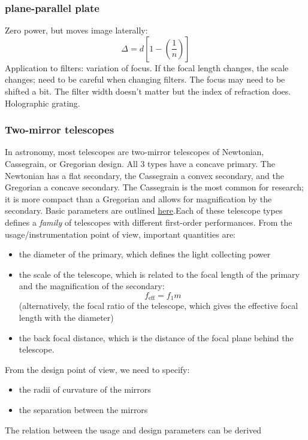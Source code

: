 \documentclass[12pt]{article}
\newcommand{\mynotes}[1]{\textcolor{myBlue}{#1}}
\begin{document}
\subsubsection{plane-parallel plate}
Zero power, but moves image laterally:
\[
    \Delta = d \left[ 1 - \left( \frac{1}{n} \right) \right]
    \]
Application to filters: variation of focus.
\mynotes{If the focal length
changes, the scale changes; need to be careful when changing filters.
The focus may need to be shifted a bit. The filter width doesn't matter
but the index of refraction does. Holographic grating.}

\subsubsection{Two-mirror telescopes}
In astronomy, most telescopes are two-mirror telescopes of Newtonian,
Cassegrain, or Gregorian design. All 3 types have a concave primary. The
Newtonian has a flat secondary, the Cassegrain a convex secondary, and the
Gregorian a concave secondary. The Cassegrain is the most common for research;
it is more compact than a Gregorian and allows for magnification by the
secondary. Basic parameters are outlined \href{http://astronomy.nmsu.edu/holtz/a535/html/diagrams/a535/cassegra.htm}
{here}.Each of these telescope types defines a \textit{family} of telescopes
with different first-order performances. From the usage/instrumentation point
of view, important quantities are:
\begin{itemize}
    \item the diameter of the primary, which defines the light
        collecting power
    \item the scale of the telescope, which is related to the focal
        length of the primary and the magnification of the secondary:
        \[
            f_{\textrm{eff}} = f_{1}m
            \]
        (alternatively, the focal ratio of the telescope, which gives
        the effective focal length with the diameter)
    \item the back focal distance, which is the distance of the focal
        plane behind the telescope.
\end{itemize}
From the design point of view, we need to specify:
\begin{itemize}
    \item the radii of curvature of the mirrors
    \item the separation between the mirrors
\end{itemize}
The relation between the usage and design parameters can be derived
\end{document}
